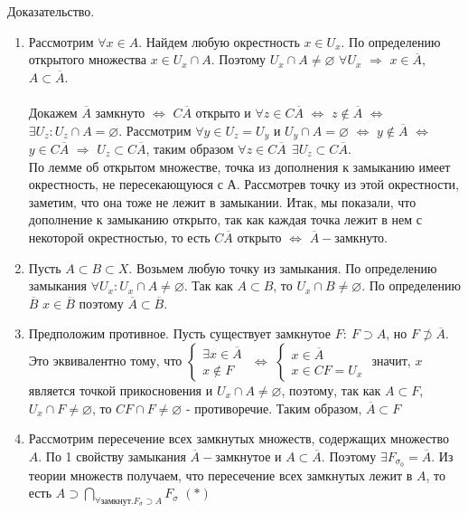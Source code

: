 \begin{theorem} 
Доказательство. \\
\begin{enumerate}
    \item Рассмотрим $\forall x\in A$. Найдем любую окрестность $x\in U_x$. По определению открытого множества $x{\in}U_x{\cap}A$. Поэтому $U_x{\cap}A{\neq}\varnothing$ $\forall U_x$ $\Rightarrow$ $x{\in}\overline{A}$, $A\subset \overline{A}$. \\\\Докажем $\overline{A}$ замкнуто $\Leftrightarrow$ $C\overline{A}$ открыто и $\forall z{\in}C\overline{A}$ $\Leftrightarrow$ $z{\notin}\overline{A}$ $\Leftrightarrow$ $\exists U_z: U_z{\cap}A=\varnothing$. Рассмотрим $\forall y{\in}U_z=U_y$ и $U_y{\cap}A=\varnothing$ $\Leftrightarrow$ $y{\notin}\overline{A}$ $\Leftrightarrow$ $y{\in}C\overline{A}$ $\Rightarrow$ $U_z{\subset}C\overline{A}$, таким образом $\forall z{\in}C\overline{A}\ \ \exists U_z{\subset}C\overline{A}$.\\По лемме об открытом множестве, точка из дополнения к замыканию имеет окрестность, не пересекающуюся с А. Рассмотрев точку из этой окрестности, заметим, что она тоже не лежит в замыкании. Итак, мы показали, что дополнение к замыканию открыто, так как каждая точка лежит в нем с некоторой окрестностью, то есть $C\overline{A}$ открыто $\Leftrightarrow$ $\overline{A}-$замкнуто.\\
  \item Пусть $A\subset B\subset X$. Возьмем любую точку из замыкания. По определению замыкания $\forall U_x: U_x{\cap}A{\neq}\varnothing$. Так как $A{\subset}B$, то $ U_x{\cap}B{\neq}\varnothing$. По определению $\overline{B}$ $x{\in}\overline{B}$ поэтому $\overline{A}\subset\overline{B}$.
  \item Предположим противное. Пусть существует замкнутое $F:\ F\supset A$, но $F\not\supset \overline{A}$. Это эквивалентно тому, что $\begin{cases}
  \exists x{\in}\overline{A}\\
  x{\notin}F
  \end{cases}$ $\Leftrightarrow$ $\begin{cases}
  x{\in}\overline{A}\\
  x{\in}CF=U_x
  \end{cases}$ значит, $x$ является точкой прикосновения и $U_x{\cap}A{\neq}\varnothing$, поэтому, так как $A{\subset}F$, $U_x{\cap}F{\neq}\varnothing$, то $CF\cap F\ne\varnothing$ - противоречие. Таким образом, $\overline{A}{\subset}F$\\
  \item Рассмотрим пересечение всех замкнутых множеств, содержащих множество $A$. По 1 свойству замыкания $\overline{A}-$замкнутое и $A{\subset}\overline{A}$. Поэтому $\exists F_{\sigma_0}=\overline{A}$. Из теории множеств получаем, что пересечение всех замкнутых лежит в $A$, то есть $A{\supset}\bigcap\limits_{\forall\text{замкнут.}F_{\sigma}{\supset}A} F_\sigma$ $(*)$ \\

\end{enumerate}
\end{theorem}
